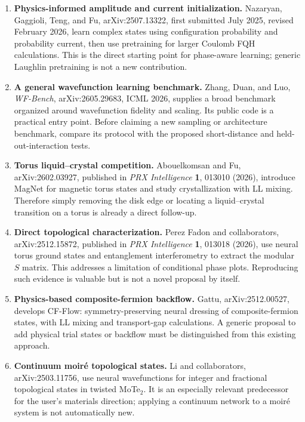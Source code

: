 \documentclass[11pt,letterpaper]{article}
\begin{document}
\begin{enumerate}
\item \textbf{Physics-informed amplitude and current initialization.} Nazaryan, Gaggioli, Teng, and Fu, arXiv:2507.13322, first submitted July 2025, revised February 2026, learn complex states using configuration probability and probability current, then use pretraining for larger Coulomb FQH calculations. This is the direct starting point for phase-aware learning; generic Laughlin pretraining is not a new contribution.\cite{nazaryan}
\item \textbf{A general wavefunction learning benchmark.} Zhang, Duan, and Luo, \emph{WF-Bench}, arXiv:2605.29683, ICML 2026, supplies a broad benchmark organized around wavefunction fidelity and scaling. Its public code is a practical entry point. Before claiming a new sampling or architecture benchmark, compare its protocol with the proposed short-distance and held-out-interaction tests.\cite{wfbench,wfbenchcode}
\item \textbf{Torus liquid--crystal competition.} Abouelkomsan and Fu, arXiv:2602.03927, published in \emph{PRX Intelligence} \textbf{1}, 013010 (2026), introduce MagNet for magnetic torus states and study crystallization with LL mixing. Therefore simply removing the disk edge or locating a liquid--crystal transition on a torus is already a direct follow-up.\cite{magnet}
\item \textbf{Direct topological characterization.} Perez Fadon and collaborators, arXiv:2512.15872, published in \emph{PRX Intelligence} \textbf{1}, 013018 (2026), use neural torus ground states and entanglement interferometry to extract the modular $S$ matrix. This addresses a limitation of conditional phase plots. Reproducing such evidence is valuable but is not a novel proposal by itself.\cite{fadon}
\item \textbf{Physics-based composite-fermion backflow.} Gattu, arXiv:2512.00527, develops CF-Flow: symmetry-preserving neural dressing of composite-fermion states, with LL mixing and transport-gap calculations. A generic proposal to add physical trial states or backflow must be distinguished from this existing approach.\cite{gattu}
\item \textbf{Continuum moir\'e topological states.} Li and collaborators, arXiv:2503.11756, use neural wavefunctions for integer and fractional topological states in twisted MoTe$_2$. It is an especially relevant predecessor for the user's materials direction; applying a continuum network to a moir\'e system is not automatically new.\cite{limoire}

\end{enumerate}
\end{document}

